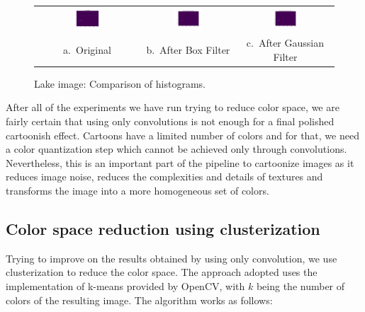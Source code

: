 \documentclass[]{IEEEtran}
\begin{document}
  \begin{figure}[t]
  \centering
  \begin{tabular}{c c c}
  \includegraphics[width=0.3\textwidth]{./figures/3/lake-hsvhist.png} &
  \includegraphics[width=0.3\textwidth]{./figures/3/lake-3-1-1-box9-hsvhist.png} &
  \includegraphics[width=0.3\textwidth]{./figures/3/lake-3-1-1-gaussian15-hsvhist.png} \\
  a.~Original & b.~After Box Filter & c.~After Gaussian Filter
  \end{tabular}
  \caption{Lake image: Comparison of histograms.}
  \label{figure:lake-hsv-hist}
  \end{figure}


  After all of the experiments we have run trying to reduce color space,
  we are fairly certain that using only convolutions is not enough for a final polished cartoonish effect.
  Cartoons have a limited number of colors and for that, we need a color quantization step which
  cannot be achieved only through convolutions. Nevertheless, this is an important part of the pipeline to cartoonize
  images as it reduces image noise, reduces the complexities and details of textures
  and transforms the image into a more homogeneous set of colors.


  \subsection{Color space reduction using clusterization}
  Trying to improve on the results obtained by using only convolution, we use
  clusterization to reduce the color space. The approach adopted uses the
  implementation of k-means provided by OpenCV, with $k$ being the number of
  colors of the resulting image. The algorithm works as follows\cite{b6}:
\end{document}
